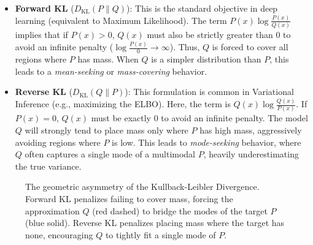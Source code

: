 \begin{itemize}
    \item \textbf{Forward KL} ($D_{\text{KL}}(P \parallel Q)$): This is the standard objective in deep learning (equivalent to Maximum Likelihood). The term $P(x) \log \frac{P(x)}{Q(x)}$ implies that if $P(x) > 0$, $Q(x)$ must also be strictly greater than $0$ to avoid an infinite penalty ($\log \frac{P(x)}{0} \to \infty$). Thus, $Q$ is forced to cover all regions where $P$ has mass. When $Q$ is a simpler distribution than $P$, this leads to a \textit{mean-seeking} or \textit{mass-covering} behavior.
    \item \textbf{Reverse KL} ($D_{\text{KL}}(Q \parallel P)$): This formulation is common in Variational Inference (e.g., maximizing the ELBO). Here, the term is $Q(x) \log \frac{Q(x)}{P(x)}$. If $P(x) = 0$, $Q(x)$ must be exactly $0$ to avoid an infinite penalty. The model $Q$ will strongly tend to place mass only where $P$ has high mass, aggressively avoiding regions where $P$ is low. This leads to \textit{mode-seeking} behavior, where $Q$ often captures a single mode of a multimodal $P$, heavily underestimating the true variance.
\end{itemize}

\begin{figure}[htbp]
\centering
{}
\caption{The geometric asymmetry of the Kullback-Leibler Divergence. Forward KL penalizes failing to cover mass, forcing the approximation $Q$ (red dashed) to bridge the modes of the target $P$ (blue solid). Reverse KL penalizes placing mass where the target has none, encouraging $Q$ to tightly fit a single mode of $P$.}
\label{fig:kl_asymmetry}
\end{figure}

